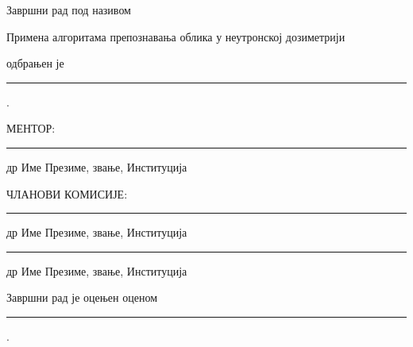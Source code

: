\pagebreak

\thispagestyle{empty}





\vspace*{2cm}

Завршни рад под називом \vspace*{3mm}

\centerline{Примена алгоритама препознавања облика у неутронској дозиметрији} 
\vspace*{3mm}

\noindent одбрањен је \rule{3cm}{0.5pt}.
\vspace*{2cm}


\noindent МЕНТОР:
\vspace*{1cm}

\noindent \rule{7cm}{0.5pt}

\noindent др Име Презиме, звање, Институција
\vspace*{2cm}

 

{\phantom{a}\hfill ЧЛАНОВИ
КОМИСИЈЕ:\qquad\qquad\qquad}
\vspace*{1cm}

\noindent\hspace*{6cm}\rule{7cm}{0.5pt}

\noindent\hspace*{6cm} др Име Презиме, звање, Институција
\vspace*{1cm}

\noindent\hspace*{6cm}\rule{7cm}{0.5pt}

\noindent\hspace*{6cm} др Име Презиме, звање, Институција

\vspace*{2cm}

Завршни рад је оцењен оценом \rule{3cm}{0.5pt}.
